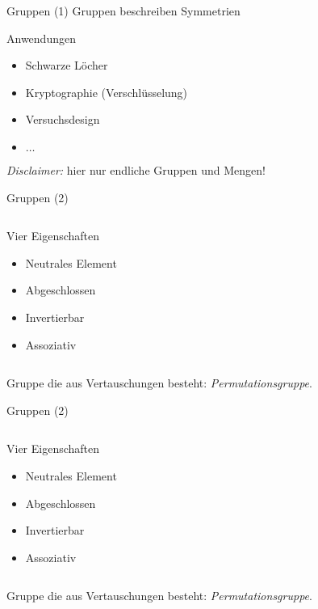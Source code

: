 \begin{frame}{Gruppen (1)}
Gruppen beschreiben Symmetrien

Anwendungen
\begin{itemize}
\item Schwarze Löcher
\item Kryptographie (Verschlüsselung)
\item Versuchsdesign
\item $\ldots$
\end{itemize}

\emph{Disclaimer:} hier nur endliche Gruppen und Mengen!
\end{frame}

\begin{frame}
\end{frame}

\begin{frame}{Gruppen (2)}
\begin{columns}
\begin{column}{0.4\textwidth}
Vier Eigenschaften
\begin{itemize}
\pause
\item Neutrales Element
\pause
\item Abgeschlossen
\pause
\item Invertierbar
\pause
\item Assoziativ
\end{itemize}
\end{column}
\begin{column}{0.5\textwidth}
\begin{center}
\end{center}
\end{column}
\end{columns}
Gruppe die aus Vertauschungen besteht:
\emph{Permutationsgruppe}.
\end{frame}

\begin{frame}[noframenumbering]{Gruppen (2)}
\begin{columns}
\begin{column}{0.4\textwidth}
Vier Eigenschaften
\begin{itemize}
\pause
\item Neutrales Element
\pause
\item Abgeschlossen
\pause
\item Invertierbar
\pause
\item Assoziativ
\end{itemize}
\end{column}
\begin{column}{0.5\textwidth}
\begin{center}
\end{center}
\end{column}
\end{columns}
Gruppe die aus Vertauschungen besteht:
\emph{Permutationsgruppe}.
\end{frame}

